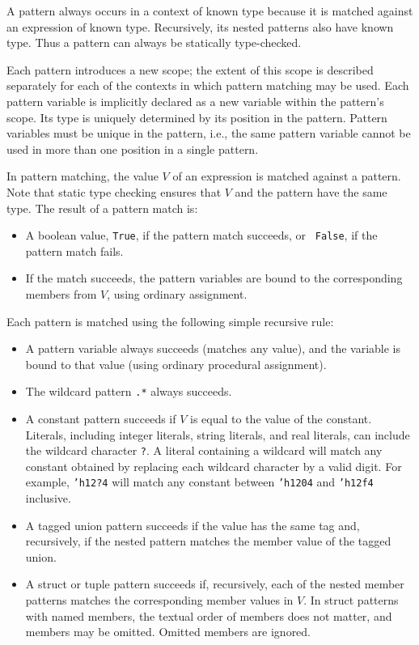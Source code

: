 \documentclass[twoside,letterpaper]{article}
\newcommand{\te}[1]{\texttt{#1}}
\begin{document}
A pattern always occurs in a context of known type because it is
matched against an expression of known type.  Recursively, its nested
patterns also have known type.  Thus a pattern can always be
statically type-checked.

Each pattern introduces a new scope; the extent of this scope is
described separately for each of the contexts in which pattern
matching may be used.  Each pattern variable is implicitly declared as
a new variable within the pattern's scope.  Its type is uniquely
determined by its position in the pattern.  Pattern variables must be
unique in the pattern, i.e., the same pattern variable cannot be used
in more than one position in a single pattern.

In pattern matching, the value $V$ of an expression is matched against
a pattern.  Note that static type checking ensures that $V$ and the
pattern have the same type.  The result of a pattern match is:
\begin{itemize}

\item
A boolean value, \texttt{True}, if the pattern match succeeds, or {\tt
False}, if the pattern match fails.

\item If the match succeeds, the pattern variables are bound to the
corresponding members from $V$, using ordinary assignment.

\end{itemize}
Each pattern is matched using the following simple recursive rule:
\begin{itemize}
\item
A pattern variable always succeeds (matches any value), and the
variable is bound to that value (using ordinary procedural
assignment).

\item
The wildcard pattern \texttt{.*} always succeeds.

\item
A constant pattern succeeds if $V$ is equal to the value of the
constant. Literals, including integer literals, string literals, and
real literals, can 
include the wildcard character \te{?}.  
A literal containing a wildcard will match any
constant obtained by replacing each wildcard character by a valid
digit.  For example, \te{'h12?4} will match any constant between
\te{'h1204} and \te{'h12f4} inclusive.

\item
A tagged union pattern succeeds if the value has the same tag and,
recursively, if the nested pattern matches the member value of the
tagged union.

\item
A struct or tuple pattern succeeds if, recursively, each of the nested
member patterns matches the corresponding member values in $V$.  In
struct patterns with named members, the textual order of members does
not matter, and members may be omitted.  Omitted members are ignored.

\end{itemize}
\end{document}
